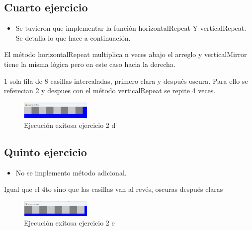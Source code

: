 \documentclass{article}
\begin{document}
	\subsection{Cuarto ejercicio}
	\begin{itemize}	
		\item Se tuvieron que implementar la función horizontalRepeat Y verticalRepeat. 
		Se detalla lo que hace a continuación.
	\end{itemize}
	
	El método horizontalRepeat multiplica n veces abajo el arreglo y verticalMirror
	tiene la misma lógica pero en este caso hacia la derecha.
	
	1 sola fila de 8 casillas intercaladas, primero clara y después oscura. Para ello se referecian 2 y despues con 
	el método verticalRepeat se repite 4 veces.
	\begin{figure}[H]
		\centering
		\includegraphics[width=0.3\textwidth,keepaspectratio]{img/e2d.png}
		\caption{Ejecución exitosa ejercicio 2 d}
	\end{figure}
	\subsection{Quinto ejercicio}
	\begin{itemize}	
		\item No se implemento método adicional.
	\end{itemize}
	
	Igual que el 4to sino que las casillas van al revés, oscuras después claras
	\begin{figure}[H]
		\centering
		\includegraphics[width=0.3\textwidth,keepaspectratio]{img/e2e.png}
		\caption{Ejecución exitosa ejercicio 2 e}
	\end{figure}
\end{document}
